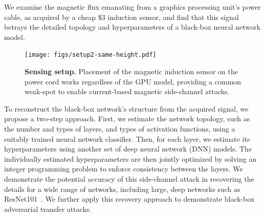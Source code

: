 \documentclass[12pt]{report}
\newcommand{\Li}{\textbf{(i)}\ }
\newcommand{\Lii}{\textbf{(ii)}\ }
\begin{document}
We examine the magnetic flux emanating from
a graphics processing unit's 
power cable, as acquired by a cheap \$3 induction sensor, 
and find that this signal betrays the detailed topology and
hyperparameters of a black-box neural network model. 

\begin{figure}[ht]
    \centering
    \texttt{[image: figs/setup2-same-height.pdf]}
    \caption{ \textbf{Sensing setup.} Placement of the magnetic induction sensor on the power cord works regardless of the GPU model, providing a common weak-spot to enable current-based magnetic side-channel attacks.}
    \label{fig:physicalSensor}
    \vspace{-2mm}
\end{figure}

To reconstruct the black-box network's structure from the acquired signal, we propose a two-step approach.
First, we estimate the network topology, such as the number and types of layers, 
and types of activation functions,
using a suitably trained neural network classifier. 
Then, for each layer, we estimate its hyperparameters 
using another set of deep neural network (DNN) models.
The individually estimated hyperparameters are then jointly optimized by solving an 
integer programming problem to enforce consistency between the layers.
We demonstrate the potential accuracy of this side-channel attack in recovering 
the details for a wide range of networks, including large, 
deep networks such as ResNet101~\cite{he2016vision}.
We further apply this recovery approach to demonstrate black-box adversarial transfer attacks.


\end{document}
